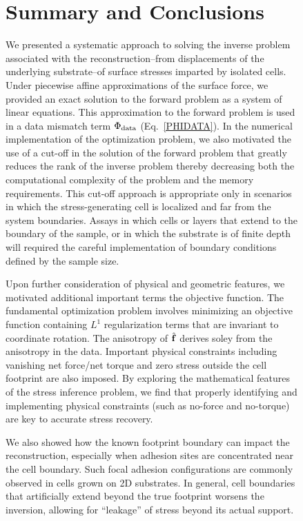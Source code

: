 \documentclass[aps,prl,reprint,twocolumn,groupedaddress,showpacs]{revtex4}
\def\f{{\bf f}}
\begin{document}
\begin{figure}
\section{Summary and Conclusions}

We presented a systematic approach to solving the inverse problem
associated with the reconstruction--from displacements of the
underlying substrate--of surface stresses imparted by isolated cells.
Under piecewise affine approximations of the surface force, we
provided an exact solution to the forward problem as a system of
linear equations. This approximation to the forward problem is used in
a data mismatch term $\Phi_{\rm data}$ (Eq.~\ref{PHIDATA}).
In the numerical implementation of the optimization problem, we also
motivated the use of a cut-off in the solution of the forward problem
that greatly reduces the rank of the inverse problem thereby
decreasing both the computational complexity of the problem and the
memory requirements. This cut-off approach is appropriate only in
scenarios in which the stress-generating cell is localized and far
from the system boundaries. Assays in which cells or layers that
extend to the boundary of the sample, or in which the substrate is of
finite depth will required the careful implementation of boundary
conditions defined by the sample size.  

Upon further consideration of physical and geometric features, 
we motivated additional important terms the objective function.   
The fundamental optimization problem involves minimizing an objective
function containing $L^{1}$ regularization terms that are invariant to
coordinate rotation. The anisotropy of $\hat{\f}$ derives soley from
the anisotropy in the data. Important physical constraints including
vanishing net force/net torque and zero stress outside the cell
footprint are also imposed. By exploring the mathematical features of
the stress inference problem, we find that properly identifying and
implementing physical constraints (such as no-force and no-torque) are
key to accurate stress recovery.

We also showed how the known footprint boundary can impact the
reconstruction, especially when adhesion sites are concentrated near
the cell boundary. Such focal adhesion configurations are commonly
observed in cells grown on 2D substrates. In general, cell boundaries
that artificially extend beyond the true footprint worsens the
inversion, allowing for ``leakage'' of stress beyond its actual
support.


\end{figure}
\end{document}
